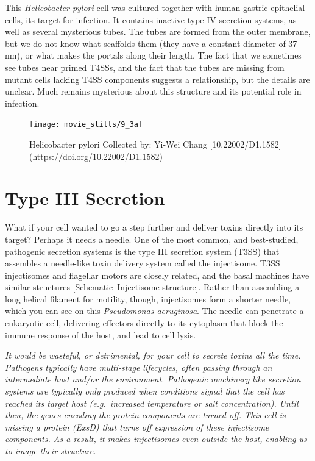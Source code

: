 \documentclass[]{tufte-book}
\begin{document}
This \emph{Helicobacter pylori} cell was cultured together with human
gastric epithelial cells, its target for infection. It contains inactive
type IV secretion systems, as well as several mysterious tubes. The
tubes are formed from the outer membrane, but we do not know what
scaffolds them (they have a constant diameter of 37 nm), or what makes
the portals along their length. The fact that we sometimes see tubes
near primed T4SSs, and the fact that the tubes are missing from mutant
cells lacking T4SS components suggests a relationship, but the details
are unclear. Much remains mysterious about this structure and its
potential role in infection.

\begin{figure}
\texttt{[image: movie\_stills/9\_3a]} \caption[Helicobacter pylori Collected by]{Helicobacter pylori Collected by: Yi-Wei Chang [10.22002/D1.1582](https://doi.org/10.22002/D1.1582)}\label{fig:unnamed-chunk-156}
\end{figure}

\section{Type III Secretion}\label{type-iii-secretion}

What if your cell wanted to go a step further and deliver toxins
directly into its target? Perhaps it needs a needle. One of the most
common, and best-studied, pathogenic secretion systems is the type III
secretion system (T3SS) that assembles a needle-like toxin delivery
system called the injectisome. T3SS injectisomes and flagellar motors
are closely related, and the basal machines have similar structures
{[}Schematic--Injectisome structure{]}. Rather than assembling a long
helical filament for motility, though, injectisomes form a shorter
needle, which you can see on this \emph{Pseudomonas aeruginosa}. The
needle can penetrate a eukaryotic cell, delivering effectors directly to
its cytoplasm that block the immune response of the host, and lead to
cell lysis.

\emph{It would be wasteful, or detrimental, for your cell to secrete
toxins all the time. Pathogens typically have multi-stage lifecycles,
often passing through an intermediate host and/or the environment.
Pathogenic machinery like secretion systems are typically only produced
when conditions signal that the cell has reached its target host
(e.g.~increased temperature or salt concentration). Until then, the
genes encoding the protein components are turned off. This cell is
missing a protein (ExsD) that turns off expression of these injectisome
components. As a result, it makes injectisomes even outside the host,
enabling us to image their structure.}
\end{document}
